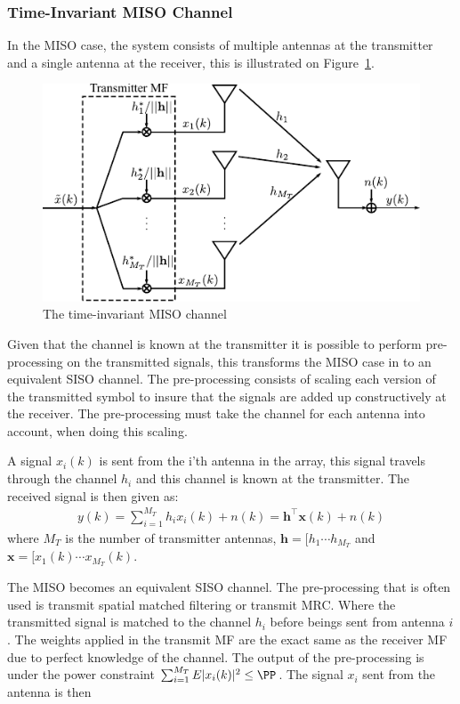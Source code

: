 \subsubsection{Time-Invariant MISO Channel}
In the MISO case, the system consists of multiple antennas at the transmitter and a single antenna at the receiver, this is illustrated on Figure~\ref{fig:misoModel}.
\begin{figure}[htbp]
  \centering
  \includegraphics[scale=1.2]{img/analysis/misoModel}
  \caption{The time-invariant MISO channel}
  \label{fig:misoModel}
\end{figure}
Given that the channel is known at the transmitter it is possible to perform pre-processing on the transmitted signals, this transforms the MISO case in to an equivalent SISO channel. The pre-processing consists of scaling each version of the transmitted symbol to insure that the signals are added up constructively at the receiver. The pre-processing must take the channel for each antenna into account, when doing this scaling. 

A signal $x_i(k)$ is sent from the i'th antenna in the array, this signal travels through the channel $h_i$ and this channel is known at the transmitter. The received signal is then given as\cite{Tim2012Practical}: 
\begin{align*}
  y(k) = \sum_{i=1}^{M_T} h_ix_i(k) + n(k) = \mathbf{h}^\intercal \mathbf{x}(k) + n(k)
\end{align*}
where $M_T$ is the number of transmitter antennas, $\mathbf{h} = [h_1 \cdots h_{M_T}$ and $\mathbf{x} = [x_1(k) \cdots x_{M_T}(k)$. 

The MISO becomes an equivalent SISO channel. The pre-processing that is often used is transmit spatial matched filtering or transmit MRC. Where the transmitted signal is matched to the channel $h_i$ before beings sent from antenna $i$. The weights applied in the transmit MF are the exact same as the receiver MF due to perfect knowledge of the channel\cite{Tim2012Practical}. The output of the pre-processing is under the power constraint $\sum_{i=1}^{M_T} E|x_i(k)|^2 \leq \PP$. The signal $x_i$ sent from the antenna is then 

